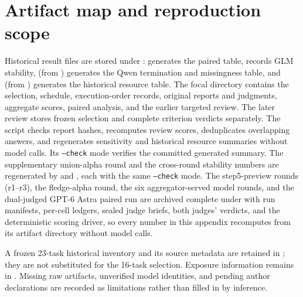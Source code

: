 \documentclass[11pt]{article}
\begin{document}
\section{Artifact map and reproduction scope}
Historical result files are stored under :  generates the paired table,  records GLM stability,  (from ) generates the Qwen termination and missingness table, and  (from ) generates the historical resource table. The focal directory contains the selection, schedule, execution-order records, original reports and judgments, aggregate scores, paired analysis, and the earlier targeted review. The later review stores frozen selection and complete criterion verdicts separately. The script  checks report hashes, recomputes review scores, deduplicates overlapping answers, and regenerates sensitivity and historical resource summaries without model calls. Its \texttt{--check} mode verifies the committed generated summary. The supplementary union-alpha round and the cross-round stability numbers are regenerated by  and , each with the same \texttt{--check} mode. The step5-preview rounds (r1--r3), the fledge-alpha round, the six aggregator-served model rounds, and the dual-judged GPT-6 Astra paired run are archived complete under  with run manifests, per-cell ledgers, sealed judge briefs, both judges' verdicts, and the deterministic scoring driver, so every number in this appendix recomputes from its artifact directory without model calls.

A frozen 23-task historical inventory and its source metadata are retained in ; they are not substituted for the 16-task selection. Exposure information remains in . Missing raw artifacts, unverified model identities, and pending author declarations are recorded as limitations rather than filled in by inference.
\end{document}

